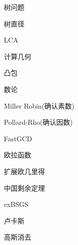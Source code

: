 \documentclass{article}
\begin{document}
\begin{enumerate}
{\bf \LARGE \item 树问题}
	
	\begin{itemize}
	
	{\bf \item 树直径}
	

	{\bf \item LCA}
	
	
	
	\end{itemize}
	
{\bf \LARGE \item 计算几何}

	\begin{itemize}
	
	{\bf \item 凸包}
		
	
	\end{itemize}

{\bf \LARGE \item 数论}

	\begin{itemize}
	
	{\bf \item Miller Robin(确认素数)}
		
	
	{\bf \item Pollard-Rho(确认因数)}	
	
	
	{\bf \item FastGCD}
	
	
	{\bf \item 欧拉函数}
	
	
	{\bf \item 扩展欧几里得}
	
	
	{\bf \item 中国剩余定理}
	
	
	{\bf \item exBSGS}
	
	
	{\bf \item 卢卡斯}
	
	
	{\bf \item 高斯消去}
	
	

\end{itemize}
\end{enumerate}
\end{document}
